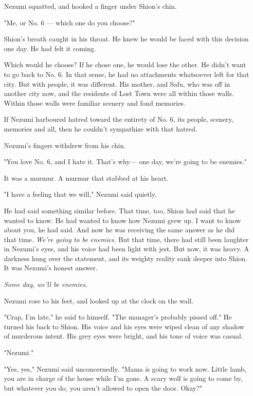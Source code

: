 Nezumi squatted, and hooked a finger under Shion's chin.

"Me, or No. 6 --- which one do you choose?"

Shion's breath caught in his throat. He knew he would be faced with this
decision one day. He had felt it coming.

Which would he choose? If he chose one, he would lose the other. He
didn't want to go back to No. 6. In that sense, he had no attachments
whatsoever left for that city. But with people, it was different. His
mother, and Safu, who was off in another city now, and the residents of
Lost Town were all within those walls. Within those walls were familiar
scenery and fond memories.

If Nezumi harboured hatred toward the entirety of No. 6, its people,
scenery, memories and all, then he couldn't sympathize with that hatred.

Nezumi's fingers withdrew from his chin.

"You love No. 6, and I hate it. That's why--- one day, we're going to be
enemies."

It was a murmur. A murmur that stabbed at his heart.

"I have a feeling that we will," Nezumi said quietly.

He had said something similar before. That time, too, Shion had said
that he wanted to know. He had wanted to know how Nezumi grew up. I want
to know about you, he had said. And now he was receiving the same answer
as he did that time. \emph{We're going to be enemies.} But that time, there had
still been laughter in Nezumi's eyes, and his voice had been light with
jest. But now, it was heavy. A darkness hung over the statement, and its
weighty reality sank deeper into Shion. It was Nezumi's honest answer.

\emph{Some day, we'll be enemies.}

Nezumi rose to his feet, and looked up at the clock on the wall.

"Crap, I'm late," he said to himself. "The manager's probably pissed
off." He turned his back to Shion. His voice and his eyes were wiped
clean of any shadow of murderous intent. His grey eyes were bright, and
his tone of voice was casual.

"Nezumi."

"Yes, yes," Nezumi said unconcernedly. "Mama is going to work now.
Little lamb, you are in charge of the house while I'm gone. A scary wolf
is going to come by, but whatever you do, you aren't allowed to open the
door. Okay?"

